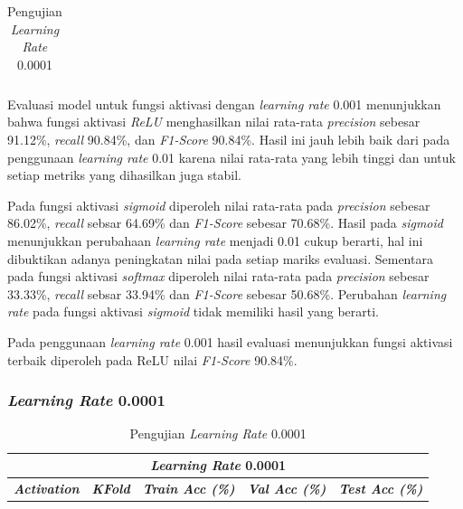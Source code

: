 \begin{table}[H]
\begin{table}[H]
\begin{tabular}{ccccc}
            \bottomrule
        \end{tabular}
        \label{Evaluasi Learning Rate 0.001 }
    \end{table} 

\vspace{1cm}


    Evaluasi model untuk fungsi aktivasi dengan \textit{learning rate} 0.001 menunjukkan bahwa fungsi aktivasi \textit{ReLU} menghasilkan nilai rata-rata \textit{precision} sebesar 91.12\%, \textit{recall} 90.84\%, dan \textit{ F1-Score} 90.84\%. Hasil ini jauh lebih baik dari pada penggunaan \textit{learning rate} 0.01 karena nilai rata-rata yang lebih tinggi dan untuk setiap metriks yang dihasilkan juga stabil. 
    
     Pada fungsi aktivasi \textit{sigmoid} diperoleh nilai rata-rata pada \textit{precision} sebesar 86.02\%, \textit{recall} sebsar 64.69\% dan\textit{ F1-Score} sebesar 70.68\%. Hasil pada \textit{sigmoid} menunjukkan perubahaan \textit{learning rate} menjadi 0.01 cukup berarti, hal ini dibuktikan adanya peningkatan nilai pada setiap mariks evaluasi. Sementara pada fungsi aktivasi \textit{softmax} diperoleh nilai rata-rata pada \textit{precision} sebesar 33.33\%, \textit{recall} sebsar 33.94\% dan\textit{ F1-Score} sebesar 50.68\%.
     Perubahan \textit{learning rate} pada fungsi aktivasi \textit{sigmoid} tidak memiliki hasil yang berarti. 
     
     Pada penggunaan \textit{learning rate} 0.001 hasil evaluasi menunjukkan fungsi aktivasi terbaik diperoleh pada ReLU nilai \textit{ F1-Score} 90.84\%.
     
  

    

   \subsubsection{\textit{Learning Rate} 0.0001} 

   
        \begin{table}[H]
        \centering
        \caption{Pengujian \textit{Learning Rate} 0.0001 }
        \begin{tabular}{ccccc}
            \toprule
            \multicolumn{5}{c}{\textit{Learning Rate} 0.0001} \\ \hline
            
            \textbf{\textit{Activation}} & \multicolumn{1}{c}{\textbf{\textit{KFold}}} & \textbf{\textit{Train Acc (\%)} } & \textbf{\textit{Val Acc (\%)}} & \textbf{\textit{Test Acc (\%)}}  \\
    

\end{tabular}
\end{table}
\end{table}
